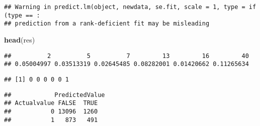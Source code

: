 \documentclass[
]{article}
\newenvironment{Shaded}{\begin{snugshade}}{\end{snugshade}}
\newcommand{\DataTypeTok}[1]{\textcolor[rgb]{0.13,0.29,0.53}{#1}}
\newcommand{\FloatTok}[1]{\textcolor[rgb]{0.00,0.00,0.81}{#1}}
\newcommand{\KeywordTok}[1]{\textcolor[rgb]{0.13,0.29,0.53}{\textbf{#1}}}
\newcommand{\NormalTok}[1]{#1}
\newcommand{\OperatorTok}[1]{\textcolor[rgb]{0.81,0.36,0.00}{\textbf{#1}}}
\begin{document}
\begin{verbatim}
## Warning in predict.lm(object, newdata, se.fit, scale = 1, type = if (type == :
## prediction from a rank-deficient fit may be misleading
\end{verbatim}

\begin{Shaded}
\begin{Highlighting}[]
\KeywordTok{head}\NormalTok{(res)}
\end{Highlighting}
\end{Shaded}

\begin{verbatim}
##          2          5          7         13         16         40 
## 0.05004997 0.03513319 0.02645485 0.08282001 0.01420662 0.11265634
\end{verbatim}

\begin{Shaded}
\end{Shaded}

\begin{verbatim}
## [1] 0 0 0 0 0 1
\end{verbatim}

\begin{Shaded}
\end{Shaded}

\begin{verbatim}
##            PredictedValue
## Actualvalue FALSE  TRUE
##           0 13096  1260
##           1   873   491
\end{verbatim}

\begin{Shaded}
\end{Shaded}
\end{document}

